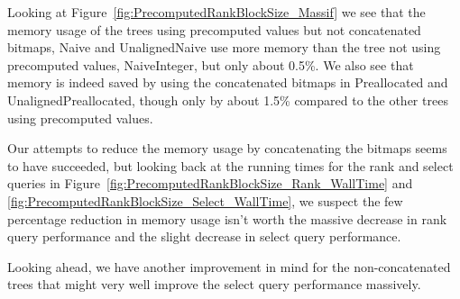 Looking at Figure~\ref{fig:PrecomputedRankBlockSize_Massif} we see that the memory usage of the trees using precomputed values but not concatenated bitmaps, Naive and UnalignedNaive use more memory than the tree not using precomputed values, NaiveInteger, but only about 0.5\%.
We also see that memory is indeed saved by using the concatenated bitmaps in Preallocated and UnalignedPreallocated, though only by about 1.5\% compared to the other trees using precomputed values.

Our attempts to reduce the memory usage by concatenating the bitmaps seems to have succeeded, but looking back at the running times for the rank and select queries in Figure~\ref{fig:PrecomputedRankBlockSize_Rank_WallTime} and \ref{fig:PrecomputedRankBlockSize_Select_WallTime}, we suspect the few percentage reduction in memory usage isn't worth the massive decrease in rank query performance and the slight decrease in select query performance.

Looking ahead, we have another improvement in mind for the non-concatenated trees that might very well improve the select query performance massively.



